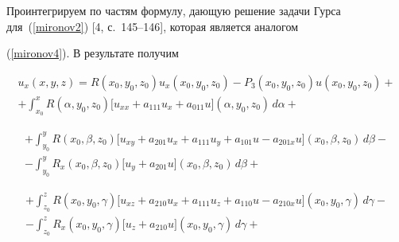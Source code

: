 Проинтегрируем по частям формулу, дающую решение задачи Гурса для~(\ref{mironov2}) [4, с.~145--146], которая является аналогом


(\ref{mironov4}). В результате получим


\begin{multline*}


u_{x}(x, y, z)=R(x_{0}, y_{0}, z_{0})u_{x}(x_{0}, y_{0}, z_{0})


-P_{3}(x_{0}, y_{0}, z_{0})u(x_{0}, y_{0}, z_{0})+


\\


+\int_{x_{0}}^{x} R(\alpha,y_{0}, z_{0})


\bigl[u_{xx}+a_{111}u_{x}+a_{011}u\bigr](\alpha,y_{0}, z_{0})\,d\alpha+


\end{multline*}





\vspace{-5mm}


\begin{multline*}


+\int_{y_{0}}^{y} R(x_{0}, \beta,z_{0})


\bigl[u_{xy}+a_{201}u_{x}+a_{111}u_{y}+a_{101}u-a_{201x}u\bigr](x_{0}, \beta,z_{0})


\,d\beta-


\\


-\int_{y_{0}}^{y} R_{x}(x_{0}, \beta,z_{0})


\bigl[u_{y}+a_{201}u\bigr](x_{0}, \beta,z_{0}) \,d\beta+


\end{multline*}





\vspace{-5mm}


\begin{multline*}


+\int_{z_{0}}^{z} R(x_{0}, y_{0}, \gamma)


\bigl[u_{xz}+a_{210}u_{x}+a_{111}u_{z}+a_{110}u-a_{210x}u \bigr](x_{0}, y_{0}, \gamma)\,d\gamma-


\\


-\int_{z_{0}}^{z} R_{x}(x_{0}, y_{0}, \gamma)


\bigl[u_{z}+a_{210}u\bigr](x_{0}, y_{0}, \gamma) \,d\gamma+


\end{multline*}





